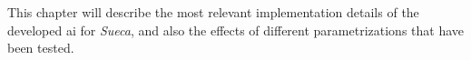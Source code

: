 \label{chapter:artificial-player}

This chapter will describe the most relevant implementation details of the developed \ac{ai} for \emph{Sueca}, and also the effects of different parametrizations that have been tested.






\cleardoublepage














